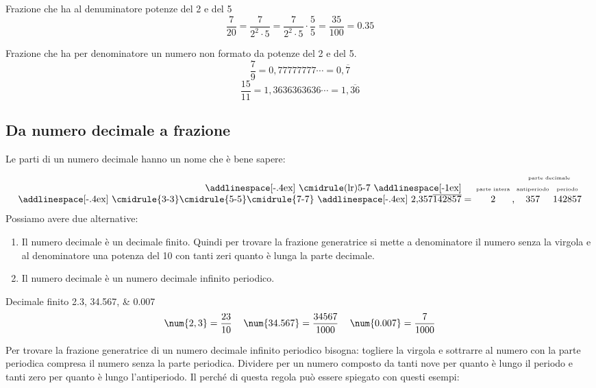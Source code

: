 \begin{esempio}
	Frazione che ha al denuminatore potenze del \num{2} e del \num{5}
 \[\dfrac{7}{20}=\dfrac{7}{2^2\cdot 5}=\dfrac{7}{2^2\cdot 5}\cdot\dfrac{5}{5}=\dfrac{35}{100}=\num{0,35}\]
\end{esempio}
\begin{esempio}
Frazione che ha per denominatore un numero non formato da potenze del \num{2} e del \num{5}.
\[\dfrac{7}{9}=0{,}77777777\cdots=0{,}\overline{7}\]\[\dfrac{15}{11}=1{,}3636363636\cdots=1{,}\overline{36}\]
\end{esempio}
\subsection{Da numero decimale a frazione}
Le parti di un numero decimale hanno un nome che è bene sapere:
\[\setlength{\tabcolsep}{1pt}
\begin{tabular}{r@{}cccccc}
&&&&\multicolumn{3}{c}{\tiny parte decimale}\\
\addlinespace[-.4ex]
\cmidrule(lr){5-7}
\addlinespace[-1ex]
&&\tiny parte intera&&\tiny antiperiodo&&\tiny periodo\\
\addlinespace[-.4ex]
\cmidrule{3-3}\cmidrule{5-5}\cmidrule{7-7}
\addlinespace[-.4ex]
$2{,}357\overline{142857}$&${}={}$&$2$&,&$357$&&$142857$
\end{tabular}
\]
Possiamo avere due alternative:
\begin{enumerate}
	\item Il numero decimale è un decimale finito. 
		Quindi per trovare la frazione generatrice si mette a denominatore il numero senza la virgola e al denominatore una potenza del \num{10} con tanti zeri quanto è lunga la parte decimale.
	\item Il numero decimale è un numero decimale infinito periodico. 
\end{enumerate}
\begin{esempio}
	Decimale finito \numlist{2,3;34,567;0.007} 
	\[\begin{tabular}{ccc}
	$\num{2,3}=\dfrac{23}{10}$&$\num{34.567}=\dfrac{34567}{1000}$&$\num{0.007}=\dfrac{7}{1000}$
	\end{tabular}\]
\end{esempio}
	Per trovare la frazione generatrice di un numero decimale infinito periodico bisogna: togliere la virgola e sottrarre al numero con la parte periodica compresa il numero senza la parte periodica. Dividere per un numero composto da tanti nove per quanto è lungo il periodo e tanti zero per quanto è lungo l'antiperiodo. Il perché di questa regola può essere spiegato con questi esempi:
